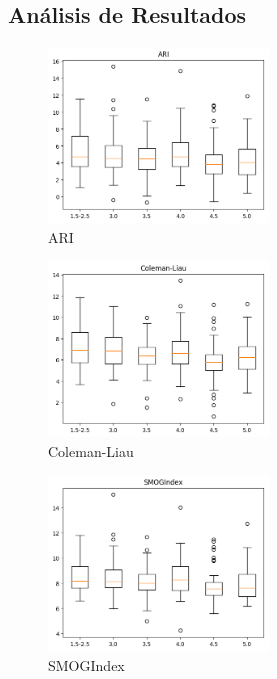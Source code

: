 \documentclass[12pt,journal,compsoc]{IEEEtran}
\begin{document}
\subsection{Análisis de Resultados}

\begin{minipage}{\linewidth}
  \centering
  \begin{minipage}{0.25\linewidth}
      \begin{figure}[H]
          \includegraphics[width=2.3in]{../unigrams/scripts/boxplots/not-normalized-ARI.png}
          \caption{ARI}
      \end{figure}
  \end{minipage}
  \hspace{0.05\linewidth}
  \begin{minipage}{0.25\linewidth}
      \begin{figure}[H]
          \includegraphics[width=2.3in]{../unigrams/scripts/boxplots/not-normalized-Coleman-Liau.png}
          \caption{Coleman-Liau}
      \end{figure}
  \end{minipage}
  \hspace{0.05\linewidth}
  \begin{minipage}{0.25\linewidth}
      \begin{figure}[H]
          \includegraphics[width=2.3in]{../unigrams/scripts/boxplots/not-normalized-SMOGIndex.png}
          \caption{SMOGIndex}
      \end{figure}
  \end{minipage}
\end{minipage}
\end{document}
